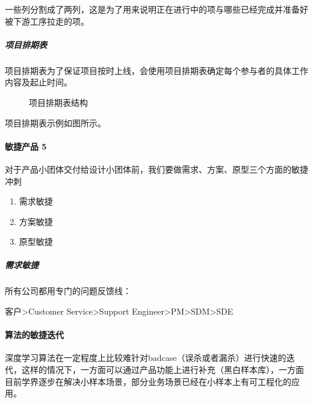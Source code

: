 \documentclass[letterpaper,10pt,english]{sphinxmanual}
\begin{document}
一些列分割成了两列，这是为了用来说明正在进行中的项与哪些已经完成并准备好被下游工序拉走的项。


\subparagraph{项目排期表}
\label{\detokenize{chapter_project/Scrum:id17}}
项目排期表为了保证项目按时上线，会使用项目排期表确定每个参与者的具体工作内容及起止时间。

\begin{figure}[H]
\centering
\capstart

\noindent{}
\caption{项目排期表结构}\label{\detokenize{chapter_project/Scrum:id23}}\end{figure}

项目排期表示例如图所示。

\begin{center}\end{center}  


\paragraph{敏捷产品 5\sphinxfootnotemark[820]}
\label{\detokenize{chapter_project/Scrum:id18}}%
\begin{footnotetext}[820]\sphinxAtStartFootnote
{}
%
\end{footnotetext}\ignorespaces 
对于产品小团体交付给设计小团体前，我们要做需求、方案、原型三个方面的敏捷冲刺
\begin{enumerate}
%
\item {} 
需求敏捷

\item {} 
方案敏捷

\item {} 
原型敏捷

\end{enumerate}


\subparagraph{需求敏捷}
\label{\detokenize{chapter_project/Scrum:id19}}
所有公司都用专门的问题反馈线：

客户\sphinxhyphen{}>Customer Service\sphinxhyphen{}>Support Engineer\sphinxhyphen{}>PM\sphinxhyphen{}>SDM\sphinxhyphen{}>SDE


\paragraph{算法的敏捷迭代}
\label{\detokenize{chapter_project/Scrum:id20}}
深度学习算法在一定程度上比较难针对badcase（误杀或者漏杀）进行快速的迭代，这样的情况下，一方面可以通过产品功能上进行补充（黑白样本库），一方面目前学界逐步在解决小样本场景，部分业务场景已经在小样本上有可工程化的应用。
\end{document}
